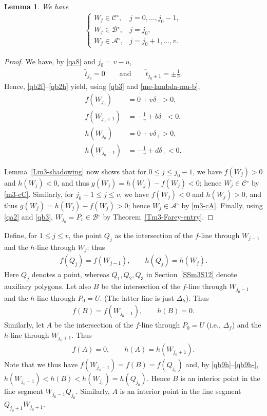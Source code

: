 \documentclass[11pt,reqno,tbtags,a4paper]{amsart}
\numberwithin{equation}{section}
\renewcommand\le{\leq}
\renewcommand\leq{\leqslant}
\theoremstyle{plain}%
\newtheorem{lemma}[theorem]{Lemma}
\theoremstyle{definition}
\theoremstyle{remark}
\newcounter{cases}
\newcommand{\refT}[1]{Theorem~\ref{#1}}
\newcommand{\refL}[1]{Lemma~\ref{#1}}
\newcommand{\refSS}[1]{Section~\ref{#1}}
\newcommand\inter{\ensuremath{^\circ}}
\newcommand\gD{\Delta}
\newcommand\cA{\mathcal A}
\newcommand\cB{\mathcal B}
\newcommand\cC{\mathcal C}
\newcommand\ttt{\widetilde t}
\newcommand\0{{\boldsymbol 0}}
\newcommand\1{{\boldsymbol 1}}
\begin{document}
\begin{lemma}\label{LQ3}
We have 
%
%
%
%
\begin{align}\label{qbb5}
  \begin{cases}
    W_j\in\cC\inter, & j=0,\dots,j_0-1,
\\
    W_j\in\cB\inter, & j=j_0,
\\
    W_j\in\cA\inter, & j=j_0+1,\dots,v.
  \end{cases}
\end{align}
\end{lemma}
\begin{proof}
We have, by \eqref{qa8} and $j_0=v-u$, 
\begin{align}\label{qb8}
  \ttt_{j_0}=0
\qquad\text{and}\qquad
\ttt_{j_0\pm1}=\pm\frac{1}v.
\end{align}
Hence, \eqref{qb2f}--\eqref{qb2h} yield,
using \eqref{qb3} and \eqref{me-lambda-mu-b},
\begin{align}\label{qb9f}
  f(W_{j_0})&=0+v\delta_->0,
\\\label{qb9f+}
  f(W_{j_0+1})&=-\frac{1}{v}+b\delta_-<0,
\\\label{qb9h}
  h(W_{j_0})&=0+v\delta_+>0,
\\\label{qb9h-}
  h(W_{j_0-1})&=-\frac{1}v+d\delta_+<0.
\end{align}


\refL{Lm3-shadowing} now shows that 
for $0\le j\le j_0-1$, we have $f(W_j)>0$ and $h(W_j)<0$, and thus 
$g(W_j)=h(W_j)-f(W_j)<0$; hence $W_j\in\cC\inter$ by \eqref{m3-cC}.
Similarly, 
for $j_0+1\le j\le v$, we have $f(W_j)<0$ and $h(W_j)>0$, and thus 
$g(W_j)=h(W_j)-f(W_j)>0$; hence $W_j\in\cA\inter$ by \eqref{m3-cA}.
Finally, using \eqref{qa2} and \eqref{qb3}, $W_{j_0}=P_v\in\cB\inter$
by \refT{Tm3-Farey-entry}.
\end{proof}


Define, for $1\le j\le v$, the point $Q_j$
as the intersection of the $f$-line through $W_{j-1}$ and the $h$-line
through $W_{j}$: thus
\begin{align}\label{m3-Qk}
        f(Q_j)=f(W_{j-1}),\qquad h(Q_j)=h(W_{j}).
\end{align}
Here $Q_j$ denotes a point, whereas $Q_1,Q_2,Q_3$ in
\refSS{SSm3S12} denote auxiliary polygons.
Let also $B$ be the intersection of the $f$-line through $W_{j_0-1}$ and the
$h$-line through $P_0=U$. (The latter line is just  $\gD_h$). Thus
\begin{align}\label{jdb}
%
  f(B)=f(W_{j_0-1}), \qquad h(B)=0.
\end{align}
Similarly, let $A$ be the intersection of the 
$f$-line through $P_0=U$ (i.e.,  $\gD_f$) 
and the $h$-line through $W_{j_0+1}$. Thus
\begin{align}\label{jda}
  f(A)=0, \qquad h(A)=h(W_{j_0+1}) .
%
\end{align}
Note that we thus have
$f(W_{j_0-1})=f(B)=f(Q_{j_0})$
and, by \eqref{qb9h}--\eqref{qb9h-},
$h(W_{j_0-1})<h(B)<h(W_{j_0})=h(Q_{j_0})$.
Hence $B$ is an interior point in the line segment $W_{j_0-1}Q_{j_0}$.
Similarly,
$A$ is an interior point in the line segment $Q_{j_0+1}W_{j_0+1}$.
\end{document}

